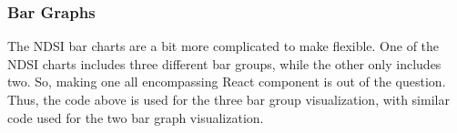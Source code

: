 \subsubsection{Bar Graphs}


The NDSI bar charts are a bit more complicated to make flexible. One of the NDSI charts includes three different bar groups, while the other only includes two. So, making one all encompassing React component is out of the question. Thus, the code above is used for the three bar group visualization, with similar code used for the two bar graph visualization.
